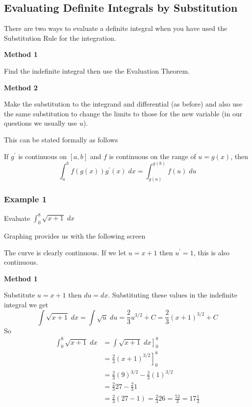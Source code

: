 \subsection{Evaluating Definite Integrals by Substitution}
There are two ways to evaluate a definite integral when you have used the Substitution Rule for the integration. 

\textbf{Method
1} 

Find the indefinite integral then use the Evaluation Theorem. 

\textbf{Method 2} 

Make
the substitution to the integrand and differential (as before) and also use the same substitution to change the limits to those for the new variable (in
our questions we usually use $u$). 

This can be stated formally as follows 

If $g^{ \prime }$ is continuous on $\left [a ,b\right ]$ and $f$ is continuous on the range of $u =g (x)$, then
\begin{equation*}\int _{a}^{b}f \left (g (x)\right ) g^{ \prime } (x)\; d x =\int _{g (a)}^{g (b)}f (u)\; d u
\end{equation*}

\subsubsection{Example 1}
Evaluate $\int _{0}^{8}\sqrt{x +1}\; d x$ 

Graphing provides us with the following screen 

   
\setlength\fboxrule{0.01in}\setlength\fboxsep{0.2in}


The curve is clearly continuous. If we let $u =x +1$ then $u^{ \prime } =1$, this is also continuous. 

\textbf{Method 1} 

Substitute $u =x +1$ then $d u =d x$. Substituting these values in the indefinite integral we get
\begin{equation*}\int \sqrt{x +1}\; d x =\int \sqrt{u}\; d u =\frac{2}{3} u^{3/2} +C =\frac{2}{3} \left (x +1\right )^{3/2} +C
\end{equation*}So
\begin{align*}\int _{0}^{8}\sqrt{x +1}\; d x &  = \left .\int \sqrt{x +1}\; d x\right ]_{0}^{8} \\
 &  = \left .\frac{2}{3} \left (x +1\right )^{3/2}\right ]_{0}^{8} \\
 &  = \frac{2}{3} \left (9\right )^{3/2} -\frac{2}{3} \left (1\right )^{3/2} \\
 &  = \frac{2}{3} 27 -\frac{2}{3} 1 \\
 &  = \frac{2}{3} \left (27 -1\right ) =\frac{2}{3} 26 =\frac{52}{3} =17\frac{1}{3}\end{align*}

